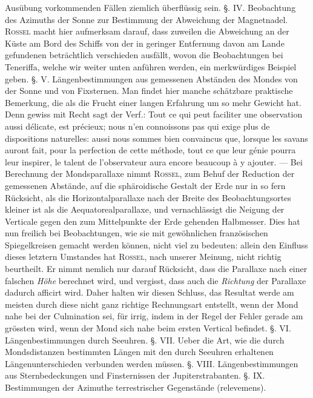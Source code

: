 Ausübung vorkommenden Fällen ziemlich überflüssig sein. §. IV. Beobachtung des Azimuths der Sonne zur Bestimmung der Abweichung der Magnetnadel. \textsc{Rossel} macht hier aufmerksam darauf, dass zuweilen die Abweichung an der Küste am Bord des Schiffs von der in geringer Entfernung davon am Lande gefundenen beträchtlich verschieden ausfällt, wovon die Beobachtungen bei Teneriffa, welche wir weiter unten anführen werden, ein merkwürdiges Beispiel geben. §. V. Längenbestimmungen aus gemessenen Abständen des Mondes von der Sonne und von Fixsternen. Man findet hier manche schätzbare praktische Bemerkung, die als die Frucht einer langen Erfahrung um so mehr Gewicht hat. Denn gewiss mit Recht sagt der Verf.: Tout ce qui peut faciliter une observation aussi délicate, est précieux; nous n'en connoissons pas qui exige plus de dispositions naturelles: aussi nous sommes bien convaincus que, lorsque les savans auront fait, pour la perfection de cette méthode, tout ce que leur génie pourra leur inspirer, le talent de l'observateur aura encore beaucoup à y ajouter. — Bei Berechnung der Mondsparallaxe nimmt \textsc{Rossel}, zum Behuf der Reduction der gemessenen Abstände, auf die sphäroidische Gestalt der Erde nur in so fern Rücksicht, als die Horizontalparallaxe nach der Breite des Beobachtungsortes kleiner ist als die Aequatorealparallaxe, und vernachlässigt die Neigung der Verticale gegen den zum Mittelpunkte der Erde gehenden Halbmesser. Dies hat nun freilich bei Beobachtungen, wie sie mit gewöhnlichen französischen Spiegelkreisen gemacht werden können, nicht viel zu bedeuten: allein den Einfluss dieses letztern Umstandes hat \textsc{Rossel}, nach unserer Meinung, nicht richtig beurtheilt. Er nimmt nemlich nur darauf Rücksicht, dass die Parallaxe nach einer falschen \emph{Höhe} berechnet wird, und vergisst, dass auch die \emph{Richtung} der Parallaxe dadurch afficirt wird. Daher halten wir diesen Schluss, das Resultat werde am meisten durch diese nicht ganz richtige Rechnungsart entstellt, wenn der Mond nahe bei der Culmination sei, für irrig, indem in der Regel der Fehler gerade am grössten wird, wenn der Mond sich nahe beim ersten Vertical befindet. §. VI. Längenbestimmungen durch Seeuhren. §. VII. Ueber die Art, wie die durch Mondsdistanzen bestimmten Längen mit den durch Seeuhren erhaltenen Längenunterschieden verbunden werden müssen. §. VIII. Längenbestimmungen aus Sternbedeckungen und Finsternissen der Jupiterstrabanten. §. IX. Bestimmungen der Azimuthe terrestrischer Gegenstände (relevemens).

